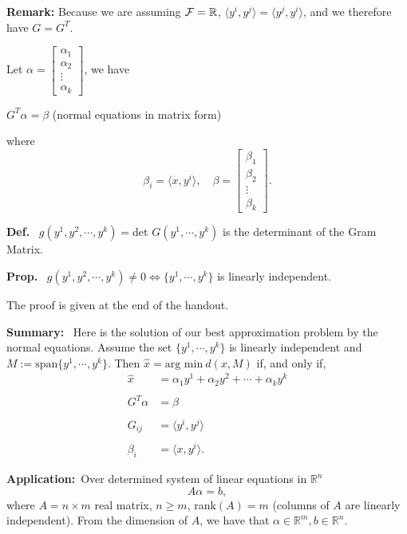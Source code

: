 \documentclass[letterpaper]{article}
\newcommand{\spanof}[1]{\textrm{span} \{ #1 \}}
\begin{document}
\noindent \textbf{Remark:} Because we are assuming $\cal F =\mathbb{R} $,  $ \langle y^i,y^j \rangle = \langle y^j,y^i \rangle $, and we therefore have $G=G^T$.

Let $\alpha=\begin{bmatrix} \alpha_1 \\ \alpha_2 \\ \vdots \\ \alpha_k  \end{bmatrix}$,  we have
\begin{center}
$G^T \alpha=\beta $ (normal equations in  matrix form)\\
\end{center}
where
$$\beta_i= \langle x,y^i \rangle ,\quad \beta=\begin{bmatrix} \beta_1 \\ \beta_2 \\ \vdots \\ \beta_k  \end{bmatrix}.$$

\newpage

\noindent \textbf{Def.}~ $g(y^1,y^2,\cdots,y^k)=$det $G(y^1,\cdots,y^k)$ is the determinant of the Gram Matrix.

\noindent \textbf{Prop.}~ $g(y^1,y^2,\cdots,y^k) \neq 0 \Leftrightarrow \{ y^1,\cdots, y^k \}$ is linearly independent.

\noindent The proof is given at the end of the handout.

\noindent \textbf{Summary:}~ Here is the solution of our best approximation problem by the normal equations. Assume the set $\{ y^1,\cdots, y^k \}$ is linearly independent and $M:=\spanof{y^1,\cdots, y^k }$. Then
$\hat{x} = \text{arg~min}~ d(x,M)$ if, and only if,
\begin{align*}
\hat{x} &= \alpha_1 y^1+ \alpha_2 y^2+ \cdots +\alpha_k y^k \\
\\
G^T \alpha &=\beta \\
\\
G_{ij}&= \langle y^i,y^j \rangle \\
\\
\beta_i &= \langle x,y^i \rangle.
\end{align*}

\newpage

\noindent \textbf{Application:}~Over determined system of linear equations in $\mathbb{R}^n$
$$A \alpha=b,$$
where $A=n \times m$ real matrix,  $n \geq m$, rank$(A)=m$ (columns of $A$ are linearly independent). From the dimension of $A$, we have that $\alpha \in \mathbb{R}^m , b \in \mathbb{R}^n$.
\end{document}
